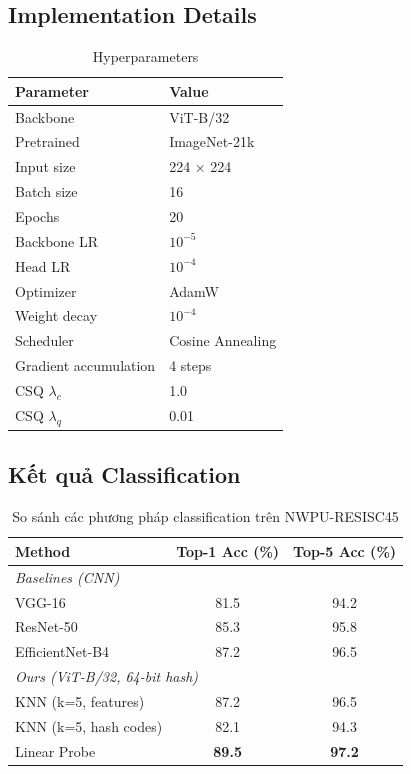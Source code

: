 \documentclass[12pt,a4paper]{article}
\begin{document}
\subsection{Implementation Details}

\begin{table}[H]
\centering
\caption{Hyperparameters}
\begin{tabular}{ll}
\toprule
\textbf{Parameter} & \textbf{Value} \\
\midrule
Backbone & ViT-B/32 \\
Pretrained & ImageNet-21k \\
Input size & 224 × 224 \\
Batch size & 16 \\
Epochs & 20 \\
Backbone LR & $10^{-5}$ \\
Head LR & $10^{-4}$ \\
Optimizer & AdamW \\
Weight decay & $10^{-4}$ \\
Scheduler & Cosine Annealing \\
Gradient accumulation & 4 steps \\
CSQ $\lambda_c$ & 1.0 \\
CSQ $\lambda_q$ & 0.01 \\
\bottomrule
\end{tabular}
\end{table}

\subsection{Kết quả Classification}

\begin{table}[H]
\centering
\caption{So sánh các phương pháp classification trên NWPU-RESISC45}
\label{tab:classification_results}
\begin{tabular}{lcc}
\toprule
\textbf{Method} & \textbf{Top-1 Acc (\%)} & \textbf{Top-5 Acc (\%)} \\
\midrule
\multicolumn{3}{l}{\textit{Baselines (CNN)}} \\
VGG-16 \cite{simonyan2015vgg} & 81.5 & 94.2 \\
ResNet-50 \cite{he2016deep} & 85.3 & 95.8 \\
EfficientNet-B4 & 87.2 & 96.5 \\
\midrule
\multicolumn{3}{l}{\textit{Ours (ViT-B/32, 64-bit hash)}} \\
KNN (k=5, features) & 87.2 & 96.5 \\
KNN (k=5, hash codes) & 82.1 & 94.3 \\
Linear Probe & \textbf{89.5} & \textbf{97.2} \\
\bottomrule
\end{tabular}
\end{table}
\end{document}
